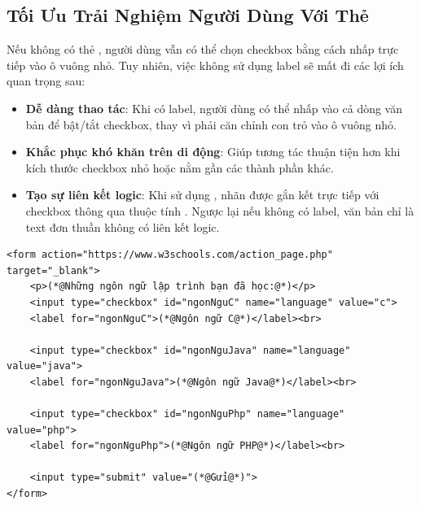 \subsection{Tối Ưu Trải Nghiệm Người Dùng Với Thẻ }

Nếu không có thẻ , người dùng vẫn có thể chọn checkbox bằng cách nhấp trực tiếp vào ô vuông nhỏ. Tuy nhiên, việc không sử dụng label sẽ mất đi các lợi ích quan trọng sau:
\begin{itemize}[leftmargin=1.5em, itemsep=2pt, parsep=0pt]
    \item \textbf{Dễ dàng thao tác}: Khi có label, người dùng có thể nhấp vào cả dòng văn bản để bật/tắt checkbox, thay vì phải căn chỉnh con trỏ vào ô vuông nhỏ.
    \item \textbf{Khắc phục khó khăn trên di động}: Giúp tương tác thuận tiện hơn khi kích thước checkbox nhỏ hoặc nằm gần các thành phần khác.
    \item \textbf{Tạo sự liên kết logic}: Khi sử dụng , nhãn được gắn kết trực tiếp với checkbox thông qua thuộc tính . Ngược lại nếu không có label, văn bản chỉ là text đơn thuần không có liên kết logic.
\end{itemize}

\begin{codeWindow}
\begin{lstlisting}[language=HTML5]
<form action="https://www.w3schools.com/action_page.php" target="_blank">
    <p>(*@Những ngôn ngữ lập trình bạn đã học:@*)</p>
    <input type="checkbox" id="ngonNguC" name="language" value="c">
    <label for="ngonNguC">(*@Ngôn ngữ C@*)</label><br>
    
    <input type="checkbox" id="ngonNguJava" name="language" value="java">
    <label for="ngonNguJava">(*@Ngôn ngữ Java@*)</label><br>
    
    <input type="checkbox" id="ngonNguPhp" name="language" value="php">
    <label for="ngonNguPhp">(*@Ngôn ngữ PHP@*)</label><br>
    
    <input type="submit" value="(*@Gửi@*)">
</form>
\end{lstlisting}
\end{codeWindow}

